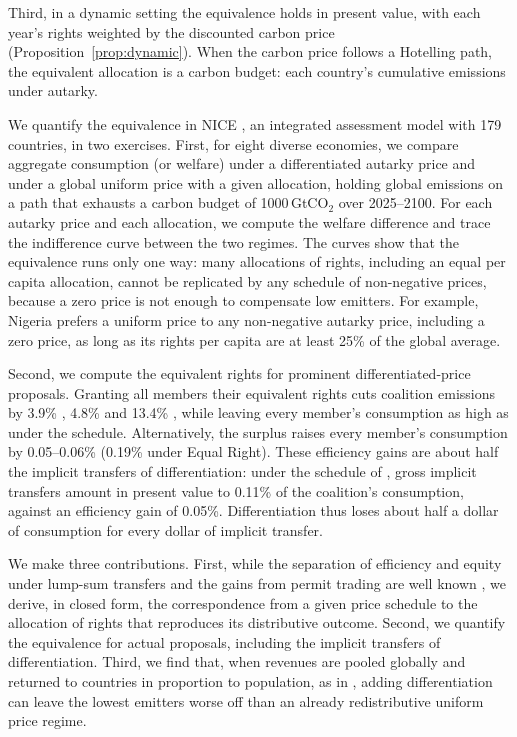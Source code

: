 \documentclass[12pt,english]{article}
\theoremstyle{remark}
\begin{document}
Third, in a dynamic setting the equivalence holds in present value, with each year's rights weighted by the discounted carbon price (Proposition~\ref{prop:dynamic}). When the carbon price follows a Hotelling path, the equivalent allocation is a carbon budget: each country's cumulative emissions under autarky.

We quantify the equivalence in NICE \citep{young-brun_within-country_2025}, an integrated assessment model with 179 countries,
in two exercises.
First, for eight diverse economies, we compare aggregate consumption (or welfare) under a differentiated autarky price and under a global uniform price with a given allocation, holding global emissions on a path that exhausts a carbon budget of 1000\,GtCO$_2$ over 2025--2100. For each autarky price
and each allocation, we compute the welfare difference and trace the indifference
curve between the two regimes.
The curves show that the equivalence runs only one way: many allocations of rights, including an equal per capita allocation, cannot be replicated by any schedule of non-negative prices, because a zero price is not enough to compensate low emitters. For example, Nigeria prefers a uniform price to any non-negative autarky price, including a zero price, as long as its rights per capita are at least 25\% of the global average.

Second, we compute the equivalent rights for prominent differentiated-price proposals.
Granting all members their equivalent rights cuts coalition emissions by 3.9\% \citep{banerjee_grand_2025}, 4.8\% \citep{wolfram_building_2025,parry_proposal_2021}
and 13.4\% \citep{equal_right_climate_2023}, while leaving every member's consumption as high as under the schedule. Alternatively, the surplus raises every member's consumption by 0.05--0.06\% (0.19\% under Equal Right). These efficiency gains are about half the implicit transfers of differentiation: under the schedule of \citet{banerjee_grand_2025}, gross implicit transfers amount in present value to 0.11\% of the coalition's consumption, against an efficiency gain of 0.05\%. Differentiation thus loses about half a dollar of consumption for every dollar of implicit transfer.

We make three contributions. First, while the separation of efficiency and equity under lump-sum transfers and the gains from permit trading are well known \citep{chichilnisky_who_1994,montgomery_markets_1972,sandmo_global_2007,fleurbaey_when_2025},
we derive, in closed form, the correspondence from a given price schedule to the allocation of rights that reproduces its distributive outcome.
Second, we quantify the equivalence for actual proposals, including the implicit transfers of differentiation. Third, we find that, when revenues are pooled globally and returned to countries in proportion to population, as in \citet{equal_right_climate_2023},
adding differentiation can leave the lowest emitters worse off than an already redistributive uniform price regime.
\end{document}
